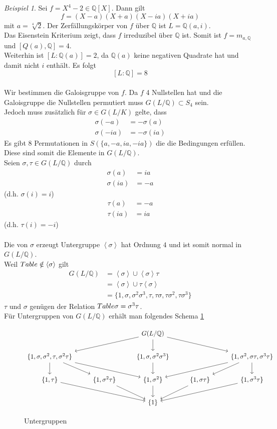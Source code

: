 \documentclass[10pt,a4paper]{article}
\newcommand{\Q}{\ensuremath{\mathbb{Q}}}
\newcommand{\grp}[1]{\left\langle#1\right\rangle}
\theoremstyle{plain}
\theoremstyle{definition}
\theoremstyle{remark}
\newtheorem{exm}[theorem]{Beispiel}
\begin{document}
	\begin{exm}
		Sei $f=X^4-2\in\Q[X]$. Dann gilt
		\[f=(X-a)(X+a)(X-ia)(X+ia)\]
		mit $a=\sqrt[4]{2}$. Der Zerfällungskörper von $f$ über $\Q$ ist $L=\Q(a,i)$.\\
		Das Eisenstein Kriterium zeigt, dass $f$ irreduzibel über $\Q$ ist. Somit ist $f=m_{a,\Q}$ und $[Q(a),\Q]=4$.\\
		Weiterhin ist $[L:\Q(a)]=2$, da $\Q(a)$ keine negativen Quadrate hat und damit nicht $i$ enthält. Es folgt
		\[[L:\Q]=8\]
		\\
		Wir bestimmen die Galoisgruppe von $f$. Da $f$ 4 Nullstellen hat und die Galoisgruppe die Nullstellen permutiert muss $G(L/\Q)\subset S_4$ sein.\\
		Jedoch muss zusätzlich für $\sigma\in G(L/K)$ gelte, dass
		\begin{align*}
		\sigma(-a)&=-\sigma(a)\\
		\sigma(-ia)&=-\sigma(ia)
		\end{align*}
		Es gibt $8$ Permutationen in $S(\{a,-a,ia,-ia\})$ die die Bedingungen erfüllen.\\
		Diese sind somit die Elemente in $G(L/\Q)$.\\
		Seien $\sigma,\tau\in G(L/\Q)$ durch
		\begin{align*}
		\sigma(a)&=ia\\
		\sigma(ia)&=-a
		\end{align*}
		(d.h. $\sigma(i)=i$)
		\begin{align*}
		\tau(a)&=-a\\
		\tau(ia)&=ia
		\end{align*}
		(d.h. $\tau(i)=-i$)\\
		\\
		Die von $\sigma$ erzeugt Untergruppe $\grp{\sigma}$ hat Ordnung $4$ und ist somit normal in $G(L/\Q)$.\\
		Weil $\tablename\notin\grp{\sigma}$ gilt
		\begin{align*}
		G(L/\Q)&=\grp{\sigma}\cup\grp{\sigma}\tau\\
		&=\grp{\sigma}\cup\tau\grp{\sigma}\\
		&=\{1,\sigma,\sigma^2\sigma^3,\tau,\tau\sigma,\tau\sigma^2,\tau\sigma^3\}
		\end{align*}
		$\tau$ und $\sigma$ genügen der Relation $\tablename\sigma=\sigma^3\tau$.\\
		Für Untergruppen von $G(L/\Q)$ erhält man folgendes Schema \ref{fig:GalUG}
		
		\begin{figure}[h]
			\centering
			\[\begin{tikzcd}
				&&G(L/\Q)\ar[lld]\ar[d]\ar[rrd]&&\\
				\{1,\sigma,\sigma^2,\tau,\sigma^2\tau\}\ar[d]\ar[rd]\ar[rrd]&&\{1,\sigma,\sigma^2\sigma^3\}\ar[d]&&\{1,\sigma^2,\sigma\tau,\sigma^3\tau\}\ar[lld]\ar[ld]\ar[d]\\
				\{1,\tau\}\ar[drr]&\{1,\sigma^2\tau\}\ar[rd]&\{1,\sigma^2\}\ar[d]&\{1,\sigma\tau\}\ar[dl]&\{1,\sigma^3\tau\}\ar[lld]\\
				&&\{1\}&&
			\end{tikzcd}\]
			\caption{Untergruppen}
			\label{fig:GalUG}
		\end{figure}
	\end{exm}
\end{document}
